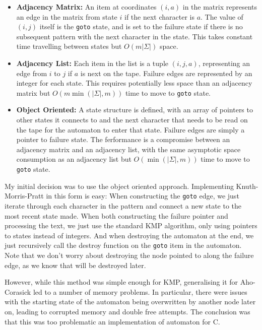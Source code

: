 \documentclass[ %
                    author={Dominic Joseph Moylett},
                    degree={MEng},
                     title={Dictionary Matching with Fingerprints},
                  subtitle={An Empirical Analysis},
                      type={research},
                      year={2015} ]{dissertation}
\begin{document}
\begin{itemize}
  \item \textbf{Adjacency Matrix:} An item at coordinates $(i,a)$ in the matrix represents an edge in the matrix from state $i$ if the next character is $a$. The value of $(i,j)$ itself is the \texttt{goto} state, and is set to the failure state if there is no subsequent pattern with the next character in the state. This takes constant time travelling between states but $O(m|\Sigma|)$ space.
  \item \textbf{Adjacency List:} Each item in the list is a tuple $(i, j, a)$, representing an edge from $i$ to $j$ if $a$ is next on the tape. Failure edges are represented by an integer for each state. This requires potentially less space than an adjacency matrix but $O(m \min(|\Sigma|, m))$ time to move to \texttt{goto} state.
  \item \textbf{Object Oriented:} A state structure is defined, with an array of pointers to other states it connects to and the next character that needs to be read on the tape for the automaton to enter that state. Failure edges are simply a pointer to failure state. The ferformance is a compromise between an adjacency matrix and an adjacency list, with the same asymptotic space consumption as an adjacency list but $O(\min(|\Sigma|, m))$ time to move to \texttt{goto} state.
\end{itemize}

My initial decision was to use the object oriented approach. Implementing Knuth-Morris-Pratt in this form is easy: When constructing the \texttt{goto} edge, we just iterate through each character in the pattern and connect a new state to the most recent state made. When both constructing the failure pointer and processing the text, we just use the standard KMP algorithm, only using pointers to states instead of integers. And when destroying the automaton at the end, we just recursively call the destroy function on the \texttt{goto} item in the automaton. Note that we don't worry about destroying the node pointed to along the failure edge, as we know that will be destroyed later.

However, while this method was simple enough for KMP, generalising it for Aho-Corasick led to a number of memory problems. In particular, there were issues with the starting state of the automaton being overwritten by another node later on, leading to corrupted memory and double free attempts. The conclusion was that this was too problematic an implementation of automaton for C.
\end{document}
